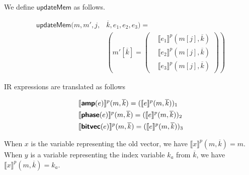 \documentclass[runningheads]{llncs}
\newcommand {\sem} [1] {\llbracket #1 \rrbracket}
\newcommand {\Psem} [1] {\sem{#1}^p}
\newcommand {\ir} [1] {\textsf{\textbf{#1}}}
\newcommand {\irAmp} {\ir{amp}}
\newcommand {\irPhase} {\ir{phase}}
\newcommand {\irBV} {\ir{bitvec}}
\newcommand {\updateMem} {\textsf{updateMem}}
\begin{document}
We define $\updateMem$ as follows.

\[
\begin{aligned}
  \updateMem(m, m', j, &\overline{k}, e_1, e_2, e_3) =\\
    &\left(m'[\overline{k}] = \left(\begin{aligned}
                          &\Psem{e_1}(m[j], \overline{k})\\
                          &\Psem{e_2}(m[j], \overline{k})\\
                          &\Psem{e_3}(m[j], \overline{k})
    \end{aligned}\right)\right)
\end{aligned}
\]

\noindent
IR expressions are translated as follows

\begin{align*}
  &\Psem{\irAmp(e)}(m, \overline{k}) = (\Psem{e}(m, \overline{k}))_1\\
  &\Psem{\irPhase(e)}(m, \overline{k}) = (\Psem{e}(m, \overline{k}))_2\\
  &\Psem{\irBV(e)}(m, \overline{k}) = (\Psem{e}(m, \overline{k}))_3
\end{align*}

When $x$ is the variable representing the old vector, we have $\Psem{x}(m, \overline{k}) = m$. When $y$ is a variable representing the index variable $k_a$ from $\overline{k}$, we have $\Psem{x}(m, \overline{k}) = k_a$.
\end{document}
